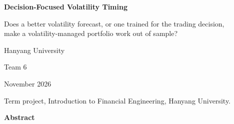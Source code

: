 \documentclass[12pt]{article}
\begin{document}
\thispagestyle{plain}
\begin{center}
{\LARGE\bfseries Decision-Focused Volatility Timing\par}
\vspace{0.8em}
{\large Does a better volatility forecast, or one trained for the trading decision,\\ make a volatility-managed portfolio work out of sample?\par}
\vspace{1.4em}
{\normalsize Hanyang University\par}
\vspace{1.2em}
{\normalsize Team 6\par}
\vspace{1.5em}
{\normalsize November 2026\par}
\vspace{1.2em}
{\footnotesize Term project, Introduction to Financial Engineering, Hanyang University.\par}
\end{center}
\vspace{0.8em}
\begin{center}{\bfseries Abstract}\end{center}
\vspace{-0.6em}
\end{document}
